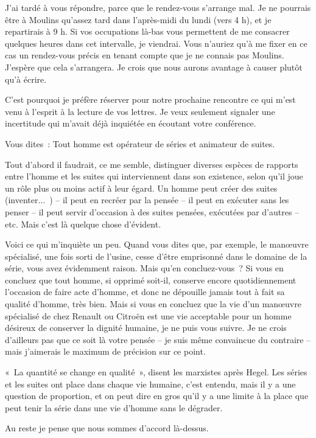 \documentclass[french,twoside]{book} %
\newcommand{\salute}[1]{\bigbreak{#1}\par\medbreak}
\begin{document}
\salute{Monsieur,}
\noindent J'ai tardé à vous répondre, parce que le rendez-vous s'arrange mal. Je ne pourrais être à Moulins qu'assez tard dans l'après-midi du lundi (vers 4 h), et je repartirais à 9 h. Si vos occupations là-bas vous permettent de me consacrer quelques heures dans cet intervalle, je viendrai. Vous n'auriez qu'à me fixer en ce cas un rendez-vous précis en tenant compte que je ne connais pas Moulins. J'espère que cela s'arrangera. Je crois que nous aurons avantage à causer plutôt qu'à écrire.\par
C'est pourquoi je préfère réserver pour notre prochaine rencontre ce qui m'est venu à l'esprit à la lecture de vos lettres. Je veux seulement signaler une incertitude qui m'avait déjà inquiétée en écoutant votre conférence.\par
Vous dites : Tout homme est opérateur de séries et animateur de suites.\par
Tout d'abord il faudrait, ce me semble, distinguer diverses espèces de rapports entre l'homme et les suites qui interviennent dans son existence, selon qu'il joue un rôle plus ou moins actif à leur égard. Un homme peut créer des suites (inventer... ) – il peut en recréer par la pensée – il peut en exécuter sans les penser – il peut servir d'occasion à des suites pensées, exécutées par d'autres – etc. Mais c'est là quelque chose d'évident.\par
Voici ce qui m'inquiète un peu. Quand vous dites que, par exemple, le manœuvre spécialisé, une fois sorti de l'usine, cesse d'être emprisonné dans le domaine de la série, vous avez évidemment raison. Mais qu'en concluez-vous ? Si vous en concluez que tout homme, si opprimé soit-il, conserve encore quotidiennement l'occasion de faire acte d'homme, et donc ne dépouille jamais tout à fait sa qualité d'homme, très bien. Mais si vous en concluez que la vie d'un manœuvre spécialisé de chez Renault ou Citroën est une vie acceptable pour un homme désireux de conserver la dignité humaine, je ne puis vous suivre. Je ne crois d'ailleurs pas que ce soit là votre pensée – je suis même convaincue du contraire – mais j'aimerais le maximum de précision sur ce point.\par
« La quantité se change en qualité », disent les marxistes après Hegel. Les séries et les suites ont place dans chaque vie humaine, c'est entendu, mais il y a une question de proportion, et on peut dire en gros qu'il y a une limite à la place que peut tenir la série dans une vie d'homme sans le dégrader.\par
Au reste je pense que nous sommes d'accord là-dessus.\par
\end{document}
